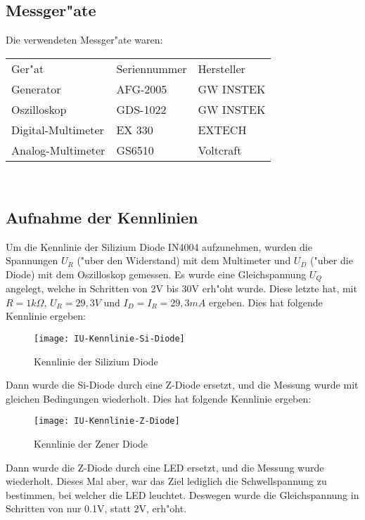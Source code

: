 \documentclass[10pt]{article}
\begin{document}
\subsection{Messger"ate}
Die verwendeten Messger"ate waren:

\begin{tabular}{l l l}
Ger"at & Seriennummer & Hersteller \\
Generator & AFG-2005 & GW INSTEK \\
Oszilloskop & GDS-1022 & GW INSTEK \\
Digital-Multimeter & EX 330 & EXTECH \\
Analog-Multimeter & GS6510 & Voltcraft\\
\end{tabular}\\

\subsection{Aufnahme der Kennlinien}
Um die Kennlinie der Silizium Diode IN4004 aufzunehmen, wurden die Spannungen $U_R$ ("uber den Widerstand) mit dem Multimeter und $U_D$ ("uber die Diode) mit dem Oszilloskop gemessen. Es wurde eine Gleichspannung $U_Q$ angelegt, welche in Schritten von 2V bis 30V erh"oht wurde. Diese letzte hat, mit $R = 1k\Omega$, $U_R = 29,3V$ und $I_D = I_R = 29,3mA$ ergeben. Dies hat folgende Kennlinie ergeben: 

\begin{figure}[h!]
  \begin{center}
    \texttt{[image: IU-Kennlinie-Si-Diode]}
    \caption{Kennlinie der Silizium Diode}
   \end{center}
\end{figure}

Dann wurde die Si-Diode durch eine Z-Diode ersetzt, und die Messung wurde mit gleichen Bedingungen wiederholt. Dies hat folgende Kennlinie ergeben: 

\begin{figure}[h!]
  \begin{center}
    \texttt{[image: IU-Kennlinie-Z-Diode]}
    \caption{Kennlinie der Zener Diode}
   \end{center}
\end{figure}

Dann wurde die Z-Diode durch eine LED ersetzt, und die Messung wurde wiederholt. Dieses Mal aber, war das Ziel lediglich die Schwellspannung zu bestimmen, bei welcher die LED leuchtet. Deswegen wurde die Gleichspannung in Schritten von nur 0.1V, statt 2V, erh"oht.
\end{document}
